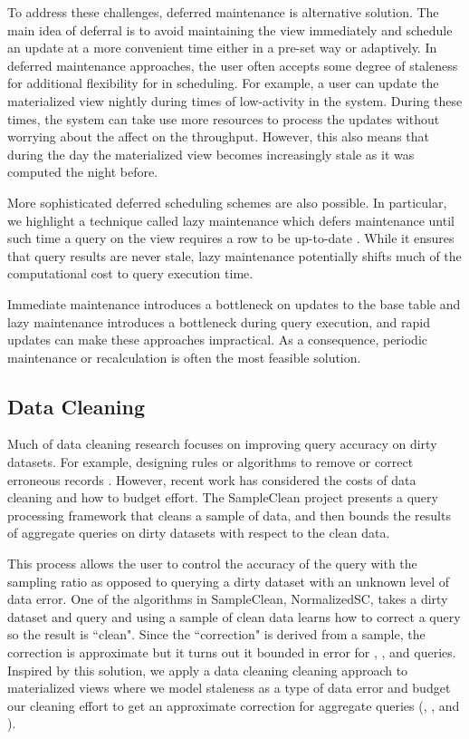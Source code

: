 To address these challenges, deferred maintenance is alternative solution.
The main idea of deferral is to avoid maintaining the view immediately and schedule an update at a more convenient time either in a pre-set way or adaptively.
In deferred maintenance approaches, the user often accepts some degree of staleness for additional flexibility for in scheduling.
For example, a user can update the materialized view nightly during times of low-activity in the system.
During these times, the system can take use more resources to process the updates without worrying about the affect on the throughput.
However, this also means that during the day the materialized view becomes increasingly stale as it was computed the night before.

More sophisticated deferred scheduling schemes are also possible.
In particular, we highlight a technique called lazy maintenance which defers maintenance until such time
a query on the view requires a row to be up-to-date \cite{zhou2007lazy}.
While it ensures that query results are never stale, lazy maintenance potentially shifts much of the computational cost to query execution time.

Immediate maintenance introduces a bottleneck on updates to the base table and lazy maintenance introduces a bottleneck during query execution,
and rapid updates can make these approaches impractical.
As a consequence, periodic maintenance or recalculation is often the most feasible solution.

\subsection{Data Cleaning}
Much of data cleaning research focuses on improving query accuracy on dirty datasets.
For example, designing rules or algorithms to remove or correct erroneous records \cite{rahm2000data}.
However, recent work has considered the costs of data cleaning and how to budget effort.
The SampleClean project presents a query processing framework that cleans a sample of data, and then bounds the results of aggregate queries on dirty datasets \cite{wang1999sample} with respect to the clean data.

This process allows the user to control the accuracy of the query with the sampling ratio as opposed to querying a dirty dataset with an unknown level of data error.
One of the algorithms in SampleClean, NormalizedSC, takes a dirty dataset and query and using a sample of clean data learns how
to correct a query so the result is ``clean".
Since the ``correction" is derived from a sample, the correction is approximate but it turns out it bounded in error for  \sumfunc, \countfunc, and \avgfunc queries.
Inspired by this solution, we apply a data cleaning cleaning approach to materialized views where we model staleness as a type of data error and budget our cleaning effort to get an approximate correction for aggregate queries (\sumfunc, \countfunc, and \avgfunc).

